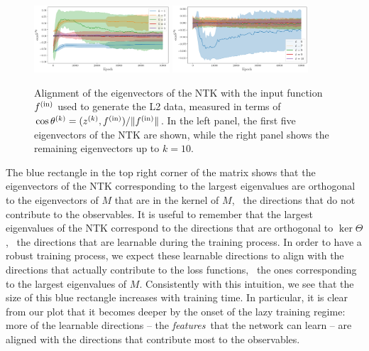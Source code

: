 \begin{figure}[ht!]
  \centering
  \includegraphics[width=0.45\textwidth]{plots/ntk_pheno/ntk_align_fin_1_L2}
  \includegraphics[width=0.45\textwidth]{plots/ntk_pheno/ntk_align_fin_2_L2}
  \caption{Alignment of the eigenvectors of the NTK with the input function
  $f^{\rm(in)}$ used to generate the L2 data, measured in terms of $\cos
  \theta^{(k)} = (z^{(k)}, f^{\rm{(in)}})/ \Vert f^{\rm{(in)}}\Vert$. In the
  left panel, the first five eigenvectors of the NTK are shown, while the right
  panel shows the remaining eigenvectors up to $k=10$.}
  \label{fig:NtkAlignFin}
\end{figure}
The blue rectangle in the top right corner of the matrix shows that the
eigenvectors of the NTK corresponding to the largest eigenvalues are orthogonal
to the eigenvectors of $M$ that are in the kernel of $M$, \ie\ the directions
that do not contribute to the observables. It is useful to remember that the
largest eigenvalues of the NTK correspond to the directions that are orthogonal
to $\ker\Theta$, \ie\ the directions that are learnable during the training
process. In order to have a robust training process, we expect these learnable
directions to align with the directions that actually contribute to the loss
functions, \ie\ the ones corresponding to the largest eigenvalues of $M$.
Consistently with this intuition, we see that the size of this blue rectangle
increases with training time. In particular, it is clear from our plot that it
becomes deeper by the onset of the lazy training regime: more of the learnable
directions -- the {\it features}\ that the network can learn -- are aligned with
the directions that contribute most to the observables. 

\FloatBarrier
